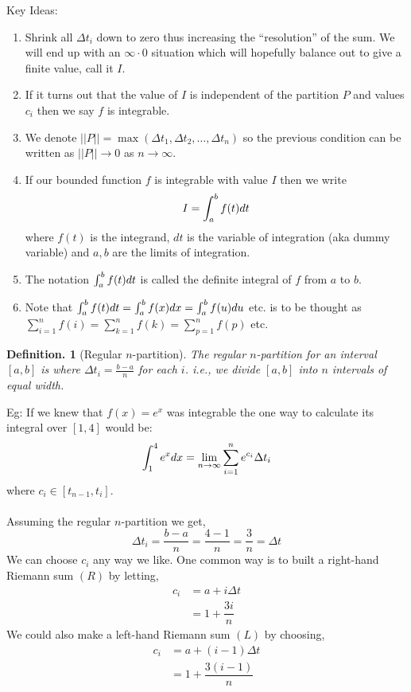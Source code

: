 \documentclass[11pt, a4paper]{memoir}
\theoremstyle{change}
\theoremstyle{plain}
\theoremstyle{nonumberplain}
\newtheorem{definition}{Definition.}
\numberwithin{equation}{section}
\begin{document}
Key Ideas:
\begin{enumerate}
    \item Shrink all $\Delta t_i$ down to zero thus increasing the “resolution” of the sum. We will end up with an $\infty \cdot 0$ situation which will hopefully balance out to give a finite value, call it $I$.
    \item If it turns out that the value of $I$ is independent of the partition $P$ and values $c_i$ then we say $f$ is integrable.
    \item We denote $||P|| = \max(\Delta t_1, \Delta t_2, \dots, \Delta t_n)$ so the previous condition can be written as $||P|| \to 0$ as $n \to \infty$.
    \item If our bounded function $f$ is integrable with value $I$ then we write $$I = \int^b_a f(t) \space dt$$ where $f(t)$ is the integrand, $dt $ is the variable of integration (aka dummy variable) and $a, b$ are the limits of integration.
    \item The notation $\int^b_a f(t) \space dt$ is called the definite integral of $f$ from $a$ to $b$.
    \item Note that $\int^b_a f(t) \space dt  = \int^b_a f(x) \space dx = \int^b_a f(u) \space du $  etc. is to be thought as $\sum^{n}_{i=1}f(i) = \sum^{n}_{k=1}f(k) = \sum^{n}_{p=1}f(p)$ etc.
\end{enumerate}
\begin{definition}[Regular $n$-partition]
The regular $n$-partition for an interval $[a, b]$ is where $\Delta t_i = \frac{b-a}{n}$ for each $i$. 
i.e., we divide $[a, b]$ into $n$ intervals of equal width.
\end{definition}
Eg: If we knew that $f(x) = e^x$ was integrable the one way to calculate its integral over $[1, 4]$ would be: $$\int^4_1 e^x \space dx = \lim_{n \to \infty} \sum^n_{i=1} e^{c_i}\Delta t_i$$ where $c_i \in [t_{n-1}, t_i]$. \\ \space \\
Assuming the regular $n$-partition we get, $$\Delta t_i = \dfrac{b-a}{n} = \dfrac{4-1}{n} = \dfrac{3}{n} = \Delta t$$ We can choose $c_i$ any way we like. One common way is to built a right-hand Riemann sum $(R)$ by letting, 
\begin{align*}
    c_i &= a + i \Delta t \\
    &= 1 + \dfrac{3i}{n}
\end{align*}
We could also make a left-hand Riemann sum $(L)$ by choosing,
\begin{align*}
    c_i &= a + (i-1) \Delta t\\
    &= 1 + \dfrac{3(i-1)}{n}
\end{align*}
\end{document}
